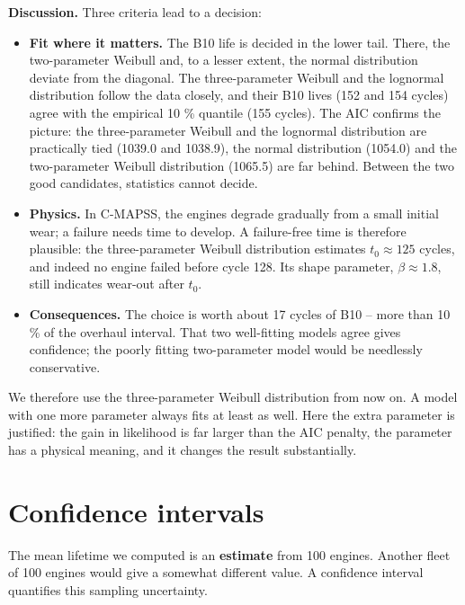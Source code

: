 \documentclass[
  letterpaper,
  DIV=11,
  numbers=noendperiod]{scrreprt}
\providecommand{\tightlist}{%
  \setlength{\itemsep}{0pt}\setlength{\parskip}{0pt}}\usepackage{longtable,booktabs,array}
\begin{document}
\textbf{Discussion.} Three criteria lead to a decision:

\begin{itemize}
\tightlist
\item
  \textbf{Fit where it matters.} The B10 life is decided in the lower
  tail. There, the two-parameter Weibull and, to a lesser extent, the
  normal distribution deviate from the diagonal. The three-parameter
  Weibull and the lognormal distribution follow the data closely, and
  their B10 lives (152 and 154 cycles) agree with the empirical 10 \%
  quantile (155 cycles). The AIC confirms the picture: the
  three-parameter Weibull and the lognormal distribution are practically
  tied (1039.0 and 1038.9), the normal distribution (1054.0) and the
  two-parameter Weibull distribution (1065.5) are far behind. Between
  the two good candidates, statistics cannot decide.
\item
  \textbf{Physics.} In C-MAPSS, the engines degrade gradually from a
  small initial wear; a failure needs time to develop. A failure-free
  time is therefore plausible: the three-parameter Weibull distribution
  estimates \(t_0 \approx 125\) cycles, and indeed no engine failed
  before cycle 128. Its shape parameter, \(\beta \approx 1.8\), still
  indicates wear-out after \(t_0\).
\item
  \textbf{Consequences.} The choice is worth about 17 cycles of B10 --
  more than 10 \% of the overhaul interval. That two well-fitting models
  agree gives confidence; the poorly fitting two-parameter model would
  be needlessly conservative.
\end{itemize}

We therefore use the three-parameter Weibull distribution from now on. A
model with one more parameter always fits at least as well. Here the
extra parameter is justified: the gain in likelihood is far larger than
the AIC penalty, the parameter has a physical meaning, and it changes
the result substantially.

\section{Confidence intervals}\label{confidence-intervals}

The mean lifetime we computed is an \textbf{estimate} from 100 engines.
Another fleet of 100 engines would give a somewhat different value. A
confidence interval quantifies this sampling uncertainty.
\end{document}

